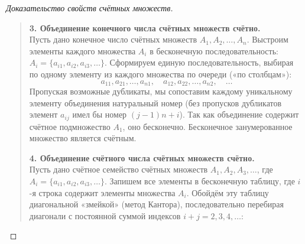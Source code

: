 \begin{proof}[Доказательство свойств счётных множеств]
\begin{quote}
        \textbf{3. Объединение конечного числа счётных множеств счётно.}\\
        Пусть дано конечное число счётных множеств $A_1, A_2, \dots, A_n$. 
        Выстроим элементы каждого множества $A_i$ в бесконечную 
        последовательность: $A_i = \{a_{i1}, a_{i2}, a_{i3}, \dots\}$. 
        Сформируем единую последовательность, выбирая по одному элементу из 
        каждого множества по очереди («по столбцам»):
        \[
            a_{11}, a_{21}, \dots, a_{n1}, \quad
            a_{12}, a_{22}, \dots, a_{n2}, \quad \dots
        \]
        Пропуская возможные дубликаты, мы сопоставим каждому уникальному 
        элементу объединения натуральный номер (без пропусков дубликатов 
        элемент $a_{ij}$ имел бы номер $(j - 1)n + i$). Так как объединение 
        содержит счётное подмножество $A_1$, оно бесконечно. Бесконечное 
        занумерованное множество является счётным.

        \textbf{4. Объединение счётного числа счётных множеств счётно.}\\
        Пусть дано счётное семейство счётных множеств $A_1, A_2, A_3, \dots$, 
        где $A_i = \{a_{i1}, a_{i2}, a_{i3}, \dots\}$. Запишем все элементы 
        в бесконечную таблицу, где $i$-я строка содержит элементы множества 
        $A_i$. Обойдём эту таблицу диагональной «змейкой» (метод Кантора), 
        последовательно перебирая диагонали с постоянной суммой индексов 
        $i + j = 2, 3, 4, \dots$:

        \begin{figure}[H]
            \centering
\end{figure}
\end{quote}
\end{proof}
